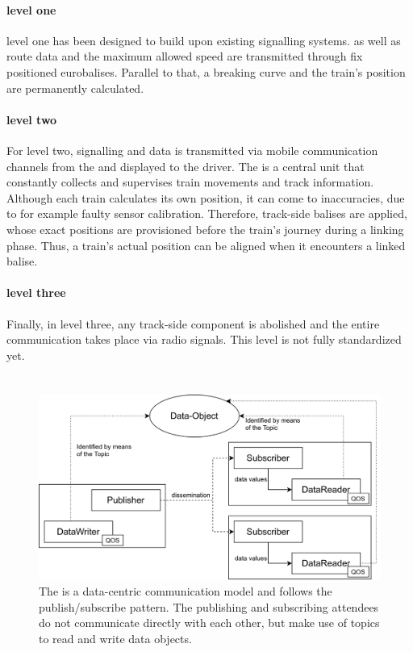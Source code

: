 \paragraph{ level one}
 level one has been designed to build upon existing signalling systems.
 as well as route data and the maximum allowed speed are transmitted through fix positioned eurobalises.
Parallel to that, a breaking curve and the train's position are permanently calculated.

\paragraph{ level two}
For  level two, signalling and  data is transmitted via mobile communication channels from the  and displayed to the driver.
The  is a central unit that constantly collects and supervises train movements and track information.
Although each train calculates its own position, it can come to inaccuracies, due to for example faulty sensor calibration.
Therefore, track-side balises are applied, whose exact positions are provisioned before the train's journey during a linking phase.
Thus, a train's actual position can be aligned when it encounters a linked balise.

\paragraph{ level three}
Finally, in  level three, any track-side component is abolished and the entire communication takes place via radio signals.
This  level is not fully standardized yet.

\section{}

\begin{figure}[!hb]
	\centering
	\includegraphics[width=0.75\linewidth]{images/DDSStructure}
	\caption{The  is a data-centric communication model and follows the publish/subscribe pattern. The publishing and subscribing attendees do not communicate directly with each other, but make use of topics to read and write data objects.}
	\label{fig:DDSStructure}
\end{figure}

